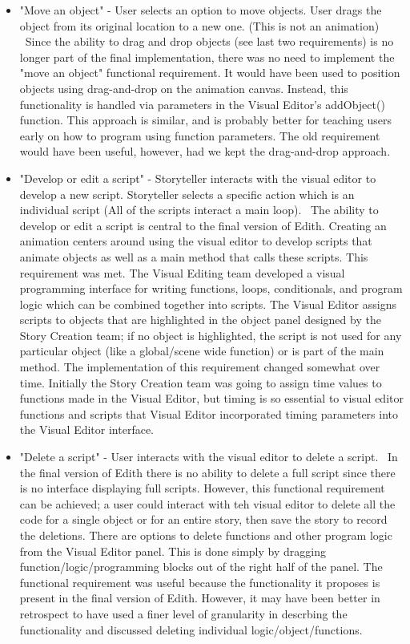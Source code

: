 \documentclass[12pt]{article}
\begin{document}
\begin{itemize}
\item "Move an object" - User selects an option to move objects. User drags the object from its original location to a new one. (This is not an animation)
\ Since the ability to drag and drop objects (see last two requirements) is no longer part of the final implementation, there was no need to implement the "move an object" functional requirement. It would have been used to position objects using drag-and-drop on the animation canvas. Instead, this functionality is handled via parameters in the Visual Editor's addObject() function. This approach is similar, and is probably better for teaching users early on how to program using function parameters. The old requirement would have been useful, however, had we kept the drag-and-drop approach.

\item "Develop or edit a script" - Storyteller interacts with the visual editor to develop a new script. Storyteller selects a specific action which is an individual script (All of the scripts interact a main loop).
\ The ability to develop or edit a script is central to the final version of Edith. Creating an animation centers around using the visual editor to develop scripts that animate objects as well as a main method that calls these scripts. This requirement was met. The Visual Editing team developed a visual programming interface for writing functions, loops, conditionals, and program logic which can be combined together into scripts. The Visual Editor assigns scripts to objects that are highlighted in the object panel designed by the Story Creation team; if no object is highlighted, the script is not used for any particular object (like a global/scene wide function) or is part of the main method. The implementation of this requirement changed somewhat over time. Initially the Story Creation team was going to assign time values to functions made in the Visual Editor, but timing is so essential to visual editor functions and scripts that Visual Editor incorporated timing parameters into the Visual Editor interface.

\item "Delete a script" - User interacts with the visual editor to delete a script.
\ In the final version of Edith there is no ability to delete a full script since there is no interface displaying full scripts. However, this functional requirement can be achieved; a user could interact with teh visual editor to delete all the code for a single object or for an entire story, then save the story to record the deletions. There are options to delete functions and other program logic from the Visual Editor panel. This is done simply by dragging function/logic/programming blocks out of the right half of the panel. The functional requirement was useful because the functionality it proposes is present in the final version of Edith. However, it may have been better in retrospect to have used a finer level of granularity in descrbing the functionality and discussed deleting individual logic/object/functions.


\end{itemize}
\end{document}
